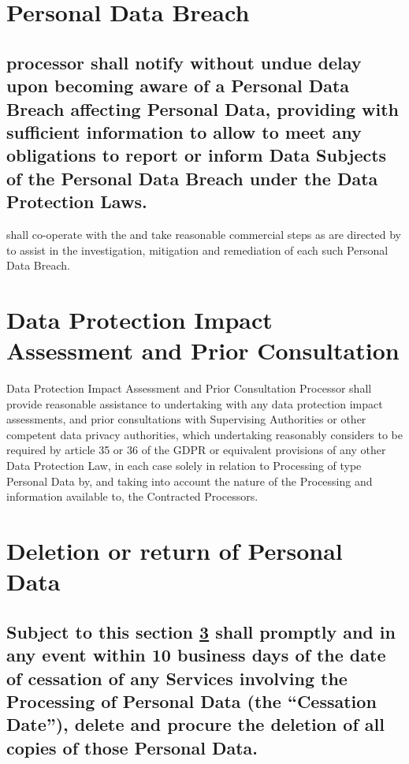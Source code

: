 \documentclass[a4paper]{article}
\begin{document}
\section{Personal Data Breach}

\subsection{\Gls{processor} shall notify  without undue delay upon  becoming aware of a Personal Data Breach affecting  Personal Data, providing  with sufficient information to allow  to meet any obligations to report or inform Data Subjects of the Personal Data Breach under the Data Protection Laws. }

 shall co-operate with the  and take reasonable commercial steps as are directed by  to assist in the investigation, mitigation and remediation of each such Personal Data Breach.

\section{Data Protection Impact Assessment and Prior Consultation}

Data Protection Impact Assessment and Prior Consultation Processor shall provide reasonable assistance to \gls{undertaking} with any data protection impact assessments, and prior consultations with Supervising Authorities or other competent data privacy authorities, which \gls{undertaking} reasonably considers to be required by article 35 or 36 of the GDPR or equivalent provisions of any other Data Protection Law, in each case solely in relation to Processing of \gls{type} Personal Data by, and taking into account the nature of the Processing and information available to, the Contracted Processors.

\section{Deletion or return of  Personal Data}
\label{deletion}

\subsection{Subject to this section \ref{deletion}  shall promptly and in any event within 10 business days of the date of cessation of any Services involving the Processing of  Personal Data (the ``\textbf{Cessation Date}''), delete and procure the deletion of all copies of those  Personal Data.}
\end{document}
